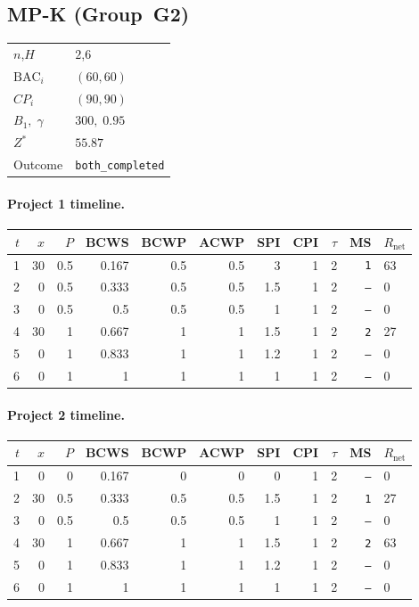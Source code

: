 \documentclass[12pt, a4paper]{article}
\newcommand{\BAC}{\mathrm{BAC}}
\begin{document}
\newpage

\subsection*{MP-K  (Group~G2)}
\begin{center}
\begin{tabular}{ll}
\toprule
$n$,\;$H$ & $2$,\;$6$ \\
$\BAC_i$ & $(60, 60)$ \\
$CP_i$   & $(90, 90)$ \\
$B_1,\;\gamma$ & $300,\;0.95$ \\
$Z^*$ & $55.87$ \\
Outcome & \texttt{both\_completed} \\
\bottomrule
\end{tabular}
\end{center}

\paragraph{Project 1 timeline.}
\begin{center}
\begin{tabular}{rrrrrrrrrrl}
\toprule
$t$ & $x$ & $P$ & BCWS & BCWP & ACWP & SPI & CPI & $\tau$ & MS & $R_{\mathrm{net}}$\\
\midrule
1 & 30 & 0.5 & 0.167 & 0.5 & 0.5 & 3 & 1 & 2 & \texttt{1} & 63 \\
2 & 0 & 0.5 & 0.333 & 0.5 & 0.5 & 1.5 & 1 & 2 & \texttt{---} & 0 \\
3 & 0 & 0.5 & 0.5 & 0.5 & 0.5 & 1 & 1 & 2 & \texttt{---} & 0 \\
4 & 30 & 1 & 0.667 & 1 & 1 & 1.5 & 1 & 2 & \texttt{2} & 27 \\
5 & 0 & 1 & 0.833 & 1 & 1 & 1.2 & 1 & 2 & \texttt{---} & 0 \\
6 & 0 & 1 & 1 & 1 & 1 & 1 & 1 & 2 & \texttt{---} & 0 \\
\bottomrule
\end{tabular}
\end{center}
\paragraph{Project 2 timeline.}
\begin{center}
\begin{tabular}{rrrrrrrrrrl}
\toprule
$t$ & $x$ & $P$ & BCWS & BCWP & ACWP & SPI & CPI & $\tau$ & MS & $R_{\mathrm{net}}$\\
\midrule
1 & 0 & 0 & 0.167 & 0 & 0 & 0 & 1 & 2 & \texttt{---} & 0 \\
2 & 30 & 0.5 & 0.333 & 0.5 & 0.5 & 1.5 & 1 & 2 & \texttt{1} & 27 \\
3 & 0 & 0.5 & 0.5 & 0.5 & 0.5 & 1 & 1 & 2 & \texttt{---} & 0 \\
4 & 30 & 1 & 0.667 & 1 & 1 & 1.5 & 1 & 2 & \texttt{2} & 63 \\
5 & 0 & 1 & 0.833 & 1 & 1 & 1.2 & 1 & 2 & \texttt{---} & 0 \\
6 & 0 & 1 & 1 & 1 & 1 & 1 & 1 & 2 & \texttt{---} & 0 \\
\bottomrule
\end{tabular}
\end{center}
\end{document}
